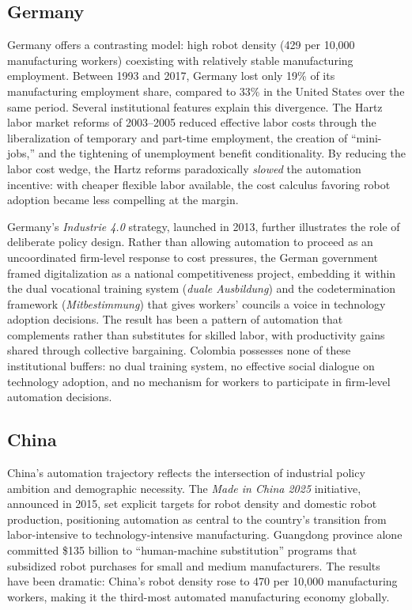 \documentclass{article}
\begin{document}
\subsection{Germany}
\label{subsec:germany}

Germany offers a contrasting model: high robot density (429 per 10,000 manufacturing workers) coexisting with relatively stable manufacturing employment. Between 1993 and 2017, Germany lost only 19\% of its manufacturing employment share, compared to 33\% in the United States over the same period. Several institutional features explain this divergence. The Hartz labor market reforms of 2003--2005 reduced effective labor costs through the liberalization of temporary and part-time employment, the creation of ``mini-jobs,'' and the tightening of unemployment benefit conditionality. By reducing the labor cost wedge, the Hartz reforms paradoxically \textit{slowed} the automation incentive: with cheaper flexible labor available, the cost calculus favoring robot adoption became less compelling at the margin.

Germany's \textit{Industrie 4.0} strategy, launched in 2013, further illustrates the role of deliberate policy design. Rather than allowing automation to proceed as an uncoordinated firm-level response to cost pressures, the German government framed digitalization as a national competitiveness project, embedding it within the dual vocational training system (\textit{duale Ausbildung}) and the codetermination framework (\textit{Mitbestimmung}) that gives workers' councils a voice in technology adoption decisions. The result has been a pattern of automation that complements rather than substitutes for skilled labor, with productivity gains shared through collective bargaining. Colombia possesses none of these institutional buffers: no dual training system, no effective social dialogue on technology adoption, and no mechanism for workers to participate in firm-level automation decisions.

\subsection{China}
\label{subsec:china}

China's automation trajectory reflects the intersection of industrial policy ambition and demographic necessity. The \textit{Made in China 2025} initiative, announced in 2015, set explicit targets for robot density and domestic robot production, positioning automation as central to the country's transition from labor-intensive to technology-intensive manufacturing. Guangdong province alone committed \$135 billion to ``human-machine substitution'' programs that subsidized robot purchases for small and medium manufacturers. The results have been dramatic: China's robot density rose to 470 per 10,000 manufacturing workers, making it the third-most automated manufacturing economy globally.
\end{document}
